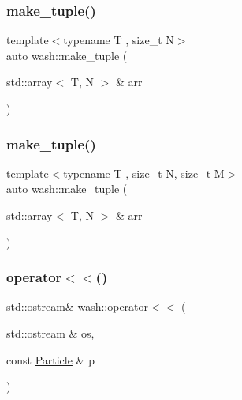 \subsubsection{\texorpdfstring{make\+\_\+tuple()}{make\_tuple()}\hspace{0.1cm}{\footnotesize\ttfamily [2/3]}}
{\footnotesize\ttfamily template$<$typename T , size\+\_\+t N$>$ \\
auto wash\+::make\+\_\+tuple (\begin{DoxyParamCaption}\item[{std\+::array$<$ T, N $>$ \&}]{arr }\end{DoxyParamCaption})}

\mbox{\label{namespacewash_a477322dfaa4429578d544d713f5d4df9}} 
\subsubsection{\texorpdfstring{make\+\_\+tuple()}{make\_tuple()}\hspace{0.1cm}{\footnotesize\ttfamily [3/3]}}
{\footnotesize\ttfamily template$<$typename T , size\+\_\+t N, size\+\_\+t M$>$ \\
auto wash\+::make\+\_\+tuple (\begin{DoxyParamCaption}\item[{std\+::array$<$ T, N $>$ \&}]{arr }\end{DoxyParamCaption})}

\mbox{\label{namespacewash_abc2f2a24cba2a641e3a2177b85b20953}} 
\subsubsection{\texorpdfstring{operator$<$$<$()}{operator<<()}}
{\footnotesize\ttfamily std\+::ostream\& wash\+::operator$<$$<$ (\begin{DoxyParamCaption}\item[{std\+::ostream \&}]{os,  }\item[{const \mbox{\hyperlink{classwash_1_1Particle}{Particle}} \&}]{p }\end{DoxyParamCaption})}

\mbox{\label{namespacewash_aba64dafc759621369351c22f65435fe6}} 
